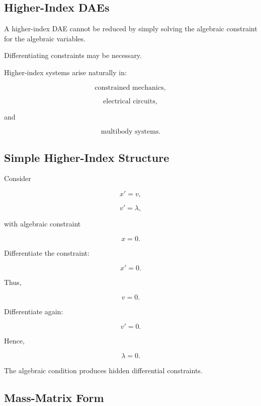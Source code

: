 \subsection{Higher-Index DAEs}
\label{subsec:higher-index-daes}

A higher-index DAE cannot be reduced by simply solving the algebraic
constraint for the algebraic variables.

Differentiating constraints may be necessary.

Higher-index systems arise naturally in:

\[
\boxed{
\text{constrained mechanics},
}
\]

\[
\boxed{
\text{electrical circuits},
}
\]

and

\[
\boxed{
\text{multibody systems}.
}
\]

\subsection{Simple Higher-Index Structure}
\label{subsec:simple-higher-index-structure}

Consider

\[
\boxed{
x'=v,
}
\]

\[
\boxed{
v'=\lambda,
}
\]

with algebraic constraint

\[
\boxed{
x=0.
}
\]

Differentiate the constraint:

\[
x'=0.
\]

Thus,

\[
v=0.
\]

Differentiate again:

\[
v'=0.
\]

Hence,

\[
\lambda=0.
\]

The algebraic condition produces hidden differential constraints.

\subsection{Mass-Matrix Form}
\label{subsec:dae-mass-matrix-form}

